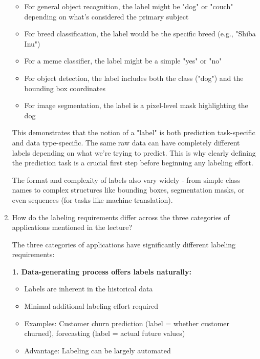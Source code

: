 \documentclass[12pt]{article}
\begin{document}
\begin{enumerate}
\begin{tcolorbox}[colback=blue!5!white,colframe=blue!75!black,title={Solution}]
    \begin{itemize}
        \item For general object recognition, the label might be "dog" or "couch" depending on what's considered the primary subject
        \item For breed classification, the label would be the specific breed (e.g., "Shiba Inu")
        \item For a meme classifier, the label might be a simple "yes" or "no"
        \item For object detection, the label includes both the class ("dog") and the bounding box coordinates
        \item For image segmentation, the label is a pixel-level mask highlighting the dog
    \end{itemize}
    
    This demonstrates that the notion of a "label" is both prediction task-specific and data type-specific. The same raw data can have completely different labels depending on what we're trying to predict. This is why clearly defining the prediction task is a crucial first step before beginning any labeling effort.
    
    The format and complexity of labels also vary widely - from simple class names to complex structures like bounding boxes, segmentation masks, or even sequences (for tasks like machine translation).
    \end{tcolorbox}
    
    \item How do the labeling requirements differ across the three categories of applications mentioned in the lecture?
    
    \begin{tcolorbox}[colback=blue!5!white,colframe=blue!75!black,title={Solution}]
    The three categories of applications have significantly different labeling requirements:
    
    \textbf{1. Data-generating process offers labels naturally:}
    \begin{itemize}
        \item Labels are inherent in the historical data
        \item Minimal additional labeling effort required
        \item Examples: Customer churn prediction (label = whether customer churned), forecasting (label = actual future values)
        \item Advantage: Labeling can be largely automated
    \end{itemize}
    

\end{tcolorbox}
\end{enumerate}
\end{document}
